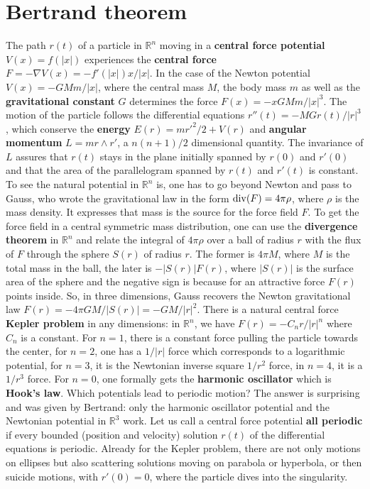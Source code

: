 \documentclass[12pt]{amsart}
\begin{document}
\section{Bertrand theorem}

The path $r(t)$ of a particle in $\mathbb{R}^n$ moving in a {\bf central force potential} $V(x)=f(|x|)$
experiences the {\bf central force} $F=-\nabla V(x)= -f'(|x|) x/|x|$. In the case of the Newton
potential $V(x)=-GMm/|x|$, where the central mass $M$, the body mass $m$ as well as  
the {\bf gravitational constant} $G$ determines the force $F(x)=-x GM m/|x|^3$.
The motion of the particle follows the differential equations $r''(t) = -M G r(t)/|r|^3$, 
which conserve the {\bf energy} $E(r)=m r'^2/2+V(r)$
and {\bf angular momentum} $L=m r \wedge r'$, a $n(n+1)/2$ dimensional quantity. The invariance of 
$L$ assures that $r(t)$ stays in the plane initially spanned by $r(0)$ and $r'(0)$
and that the area of the parallelogram spanned by $r(t)$ and $r'(t)$ is constant. 
To see the natural potential in $\mathbb{R}^n$ is, one has to go beyond Newton and
pass to Gauss, who wrote the gravitational law in the form ${\rm div}(F) = 4 \pi \rho$, where $\rho$ is the 
mass density. It expresses that mass is the source for the force field $F$. To get the
force field in a central symmetric mass distribution, one can use the {\bf divergence theorem} in $\mathbb{R}^n$ 
and relate the integral of $4 \pi \rho$ over a ball of radius $r$ with the flux of $F$ through the sphere $S(r)$
of radius $r$. The former is $4 \pi M$, where $M$ is the total mass in the ball, the later is
$-|S(r)| F(r)$, where $|S(r)|$ is the surface area of the sphere and the negative sign is because for an attractive
force $F(r)$ points inside.  So, in three dimensions, Gauss recovers the Newton gravitational law
$F(r)=-4\pi G M/|S(r)| = -G M/|r|^2$. There is a natural central
force {\bf Kepler problem} in any dimensions: in $\mathbb{R}^n$, we have $F(r)=-C_n r/|r|^n$ 
where $C_n$ is a constant. For $n=1$, there is a constant force pulling the particle towards the center,
for $n=2$, one has a $1/|r|$ force which corresponds to a logarithmic potential, for $n=3$, it is the
Newtonian inverse square $1/r^2$ force, in $n=4$, it is a $1/r^3$ force. For $n=0$, one formally gets the 
{\bf harmonic oscillator} which is {\bf Hook's law}. Which potentials lead to periodic motion? The answer is surprising
and was given by Bertrand: only the harmonic oscillator potential and the Newtonian potential in $\mathbb{R}^3$ work. Let us call
a central force potential {\bf all periodic} if every bounded (position and velocity) solution $r(t)$ of the differential equations
is periodic. Already for the Kepler problem, there are not only motions on ellipses but also 
scattering solutions moving on parabola or hyperbola, or then suicide motions, with $r'(0)=0$, where the particle 
dives into the singularity.
\end{document}
